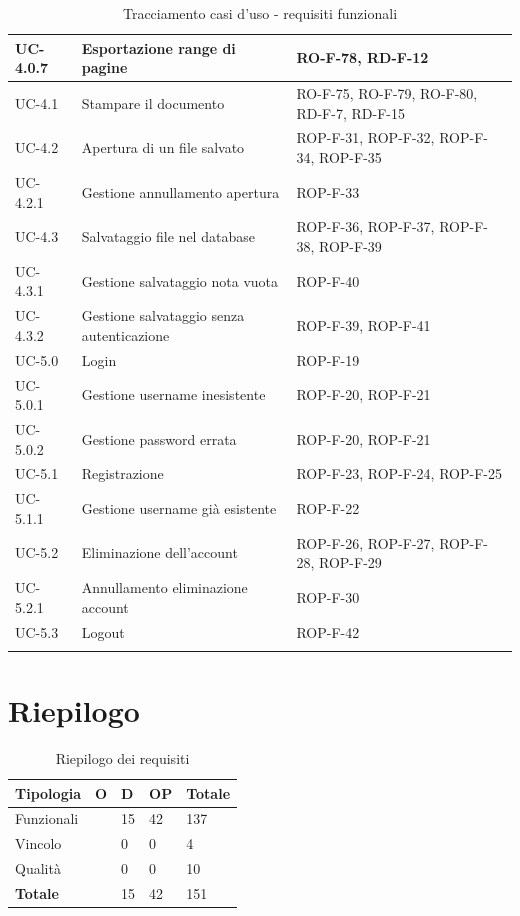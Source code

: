 \documentclass[11pt,a4paper]{article}
\begin{document}
\begin{longtable}{|p{}|p{}|>{\raggedright\arraybackslash}p{}|}
\hline
UC-4.0.7 & Esportazione range di pagine & RO-F-78, RD-F-12 \\
\hline
UC-4.1 & Stampare il documento & RO-F-75, RO-F-79, RO-F-80, RD-F-7, RD-F-15 \\
\hline
UC-4.2 & Apertura di un file salvato & ROP-F-31, ROP-F-32, ROP-F-34, ROP-F-35 \\
\hline
UC-4.2.1 & Gestione annullamento apertura & ROP-F-33 \\
\hline
UC-4.3 & Salvataggio file nel database & ROP-F-36, ROP-F-37, ROP-F-38, ROP-F-39 \\
\hline
UC-4.3.1 & Gestione salvataggio nota vuota & ROP-F-40 \\
\hline
UC-4.3.2 & Gestione salvataggio senza autenticazione & ROP-F-39, ROP-F-41 \\
\hline
UC-5.0 & Login & ROP-F-19 \\
\hline
UC-5.0.1 & Gestione username inesistente & ROP-F-20, ROP-F-21 \\
\hline
UC-5.0.2 & Gestione password errata & ROP-F-20, ROP-F-21 \\
\hline
UC-5.1 & Registrazione & ROP-F-23, ROP-F-24, ROP-F-25 \\
\hline
UC-5.1.1 & Gestione username già esistente & ROP-F-22 \\
\hline
UC-5.2 & Eliminazione dell'account & ROP-F-26, ROP-F-27, ROP-F-28, ROP-F-29 \\
\hline
UC-5.2.1 & Annullamento eliminazione account & ROP-F-30 \\
\hline
UC-5.3 & Logout & ROP-F-42 \\
\hline
\addlinespace[1em]
\caption{Tracciamento casi d'uso - requisiti funzionali}
\end{longtable}

\newpage

\section{Riepilogo}
\begin{table}[H]
\centering
\begin{tabular}{|p{}|>{\raggedright\arraybackslash}p{}|p{}|p{}|p{}|}
\hline
\textbf{Tipologia} & \textbf{O} & \textbf{D} & \textbf{OP} & \textbf{Totale}\\
\hline
Funzionali & 80 & 15 & 42 & 137 \\
\hline
Vincolo & 4 & 0 & 0 & 4 \\
\hline
Qualità & 10 & 0 & 0 & 10 \\
\hline
\textbf{Totale} & 94 & 15 & 42 & 151 \\
\hline
\end{tabular}
\caption{Riepilogo dei requisiti}
\end{table}
\end{document}

